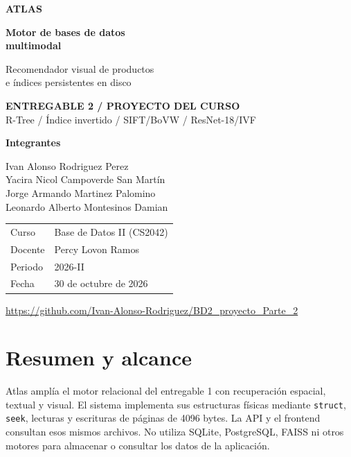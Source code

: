 \documentclass[11pt,a4paper]{article}
\newcommand{\code}[1]{\texttt{#1}}
\begin{document}
\hypersetup{pageanchor=false}
\begin{titlepage}
\vspace*{12mm}
{\color{atlas}\Large\bfseries ATLAS\par}
\vspace{17mm}
{\fontsize{32}{38}\selectfont\bfseries Motor de bases de datos\\multimodal\par}
\vspace{7mm}
{\Large Recomendador visual de productos\\e índices persistentes en disco\par}
\vspace{13mm}
\colorbox{soft}{\parbox{.91\textwidth}{\vspace{5mm}\hspace{4mm}\textcolor{atlas}{\textbf{ENTREGABLE 2 / PROYECTO DEL CURSO}}\\[3mm]\hspace{4mm}R-Tree / Índice invertido / SIFT/BoVW / ResNet-18/IVF\vspace{5mm}}}
\vfill
{\large\textbf{Integrantes}\par}
Ivan Alonso Rodriguez Perez\\
Yacira Nicol Campoverde San Martín\\
Jorge Armando Martinez Palomino\\
Leonardo Alberto Montesinos Damian\par
\vspace{9mm}
\begin{tabular}{@{}ll}
Curso & Base de Datos II (CS2042)\\
Docente & Percy Lovon Ramos\\
Periodo & 2026-II\\
Fecha & 30 de octubre de 2026
\end{tabular}\par
\vspace{7mm}
{\small\url{https://github.com/Ivan-Alonso-Rodriguez/BD2_proyecto_Parte_2}\par}
\end{titlepage}
\hypersetup{pageanchor=true}
\tableofcontents
\newpage
\section{Resumen y alcance}
Atlas amplía el motor relacional del entregable 1 con recuperación espacial, textual y visual. El sistema implementa sus estructuras físicas mediante \code{struct}, \code{seek}, lecturas y escrituras de páginas de 4096 bytes. La API y el frontend consultan esos mismos archivos. No utiliza SQLite, PostgreSQL, FAISS ni otros motores para almacenar o consultar los datos de la aplicación.
\end{document}
